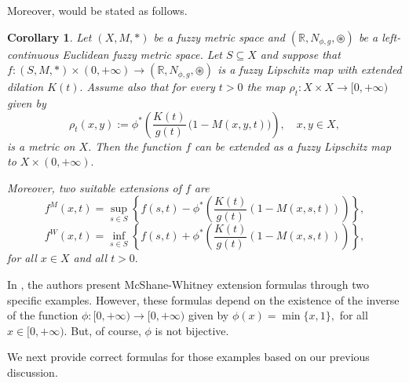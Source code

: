 \documentclass[12pt]{amsart}
\newtheorem{corollary}[theorem]{Corollary}
\begin{document}
	
	Moreover, \cite[Corollay 22]{JFRLSP21} would be stated as follows.
	
	\begin{corollary}  \label{corex}
		Let $(X,M,\ast)$ be a fuzzy metric space and  $(\mathbb R, N_{\phi,g}, \circledast)$ be a left-continuous Euclidean fuzzy metric space. Let $S \subseteq X$ and suppose that $f:(S,M,\ast) \times (0,+\infty) \to (\mathbb R,  N_{\phi,g}, \circledast)$
		is a fuzzy Lipschitz map  with extended dilation $K(t).$ Assume also that for every $t>0$ the map  $\rho_t:X\times X\to [0,+\infty)$ given by
		$$\rho_{t}(x,y) :=\phi^{*} \left(\frac{K(t)}{g(t)} \, \big( 1- M(x,y,t) \big) \right)\!,  \quad x,y \in X,
		$$
		is a metric on $X$.
		Then the function $f$ can be extended as a fuzzy Lipschitz map to $X \times (0,+\infty).$ 
		
		Moreover, two suitable extensions of $f$ are
		$$f^M(x,t)=\sup_{s\in S}\left\{f(s,t)-\phi^{*}\left(\frac{K(t)}{g(t)}(1-M(x,s,t))\right)\right\}\!,$$
		$$f^W(x,t)=\inf_{s\in S}\left\{f(s,t)+\phi^{*}\left(\frac{K(t)}{g(t)}(1-M(x,s,t))\right)\right\}\!,$$
		for all $x\in X$ and all $t>0.$
		
	\end{corollary}
	
	
	
	
	In \cite[Section 6]{JFRLSP21}, the authors present McShane-Whitney extension formulas through two specific examples. However, these formulas depend on the existence of the inverse of the function  $\phi: [0,+\infty)\to [0,+\infty)$ given by $\phi(x)=\min\{x,1\},$ for all $x\in [0,+\infty).$ But, of course, $\phi$ is not bijective. 
	
	We next provide correct formulas for those examples based on our previous discussion.
	
	
	
\end{document}
